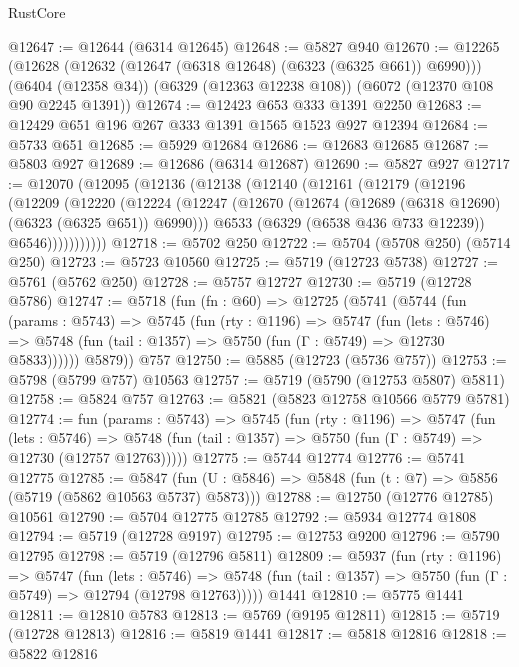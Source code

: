 \begin{lexlean}{RustCore}
\begin{coremodule}
@12647 := @12644 (@6314 @12645)
@12648 := @5827 @940
@12670 := @12265
    (@12628 (@12632 (@12647 (@6318 @12648) (@6323 (@6325 @661)) @6990)))
    (@6404 (@12358 @34))
    (@6329 (@12363 @12238 @108))
    (@6072 (@12370 @108 @90 @2245 @1391))
@12674 := @12423 @653 @333 @1391 @2250
@12683 := @12429 @651 @196 @267 @333 @1391 @1565 @1523 @927 @12394
@12684 := @5733 @651
@12685 := @5929 @12684
@12686 := @12683 @12685
@12687 := @5803 @927
@12689 := @12686 (@6314 @12687)
@12690 := @5827 @927
@12717 := @12070
    (@12095
      (@12136
        (@12138
          (@12140
            (@12161
              (@12179
                (@12196
                  (@12209
                    (@12220
                      (@12224
                        (@12247
                          (@12670 (@12674 (@12689 (@6318 @12690) (@6323 (@6325 @651)) @6990)))
                          @6533
                          (@6329 (@6538 @436 @733 @12239))
                          @6546)))))))))))
@12718 := @5702 @250
@12722 := @5704 (@5708 @250) (@5714 @250)
@12723 := @5723 @10560
@12725 := @5719 (@12723 @5738)
@12727 := @5761 (@5762 @250)
@12728 := @5757 @12727
@12730 := @5719 (@12728 @5786)
@12747 := @5718
    (fun (fn : @60) =>
    @12725
      (@5741
        (@5744
          (fun (params : @5743) =>
          @5745
            (fun (rty : @1196) =>
            @5747
              (fun (lets : @5746) =>
              @5748 (fun (tail : @1357) => @5750 (fun (Γ : @5749) => @12730 @5833))))))
        @5879))
    @757
@12750 := @5885 (@12723 (@5736 @757))
@12753 := @5798 (@5799 @757) @10563
@12757 := @5719 (@5790 (@12753 @5807) @5811)
@12758 := @5824 @757
@12763 := @5821 (@5823 @12758 @10566 @5779 @5781)
@12774 := fun (params : @5743) =>
  @5745
    (fun (rty : @1196) =>
    @5747
      (fun (lets : @5746) =>
      @5748 (fun (tail : @1357) => @5750 (fun (Γ : @5749) => @12730 (@12757 @12763)))))
@12775 := @5744 @12774
@12776 := @5741 @12775
@12785 := @5847
    (fun (U : @5846) => @5848 (fun (t : @7) => @5856 (@5719 (@5862 @10563 @5737) @5873)))
@12788 := @12750 (@12776 @12785) @10561
@12790 := @5704 @12775 @12785
@12792 := @5934 @12774 @1808
@12794 := @5719 (@12728 @9197)
@12795 := @12753 @9200
@12796 := @5790 @12795
@12798 := @5719 (@12796 @5811)
@12809 := @5937
    (fun (rty : @1196) =>
    @5747
      (fun (lets : @5746) =>
      @5748 (fun (tail : @1357) => @5750 (fun (Γ : @5749) => @12794 (@12798 @12763)))))
    @1441
@12810 := @5775 @1441
@12811 := @12810 @5783
@12813 := @5769 (@9195 @12811)
@12815 := @5719 (@12728 @12813)
@12816 := @5819 @1441
@12817 := @5818 @12816
@12818 := @5822 @12816

\end{coremodule}
\end{lexlean}
